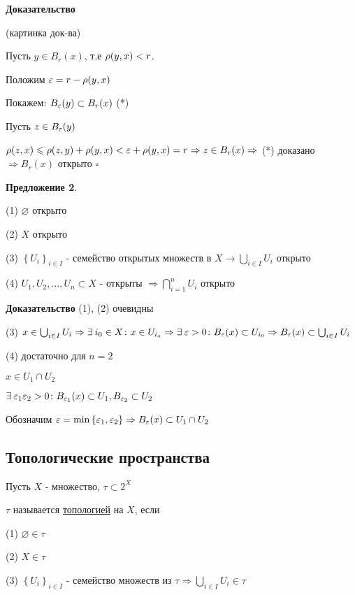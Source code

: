 \documentclass[../../main.tex]{subfiles}
\begin{document}
\textbf{Доказательство}

\begin{minipage}{0.4\linewidth}
(картинка док-ва)
\end{minipage}
\begin{minipage}{0.6\linewidth}
Пусть $y \in B_r(x)$, т.е $\rho(y,x) < r$.

Положим $\varepsilon = r - \rho(y,x)$

Покажем: $B_{\varepsilon}(y) \subset B_r(x)$ (*)

Пусть $z \in B_{\varepsilon}(y)$

$\rho(z, x) \leqslant \rho(z,y) + \rho(y,x)< \varepsilon + \rho(y,x) = r \Rightarrow z \in B_r(x) \Rightarrow $ (*) доказано $\Rightarrow B_r(x)$ открыто $\square$
\end{minipage}

\textbf{Предложение 2}.

(1) $\varnothing$ открыто

(2) $X$ открыто

(3) $\left\{ U_i \right\}_{i \in I}$ - семейство открытых множеств в $X \rightarrow \bigcup_{i \in I} U_i$ открыто

(4) $U_1, U_2, \ldots, U_n \subset X$ - открыты $\Rightarrow \bigcap^{n}_{i = 1} U_i$ открыто

\textbf{Доказательство} (1), (2) очевидны

(3) $x \in \bigcup_{i \in I} U_i \Rightarrow \exists\: i_0 \in X \colon x \in U_{i_o} \Rightarrow \exists\: \varepsilon > 0 \colon B_{\varepsilon}(x) \subset U_{i_0} \Rightarrow B_{\varepsilon}(x) \subset \bigcup_{i \in I} U_i$

(4) достаточно для $n = 2$

$x \in U_1 \cap U_2$

$\exists\: \varepsilon_1 \varepsilon_2 > 0 \colon B_{\varepsilon_1}(x) \subset U_1, B_{\varepsilon_2} \subset U_2$

Обозначим $\varepsilon = \min\left\{\varepsilon_1, \varepsilon_2 \right\} \Rightarrow B_{\varepsilon}(x) \subset  U_1 \cap U_2 $

\subsection{Топологические пространства}

 Пусть $X$ - множество, $\tau \subset 2^{X} $

$\tau$ называется \underline{топологией} на $X$, если

(1) $\varnothing \in \tau$

(2) $X \in \tau$

(3) $\left\{U_i \right\}_{i \in I}$ - семейство множеств из $\tau \Rightarrow \bigcup_{i \in I} U_i \in \tau$
\end{document}
